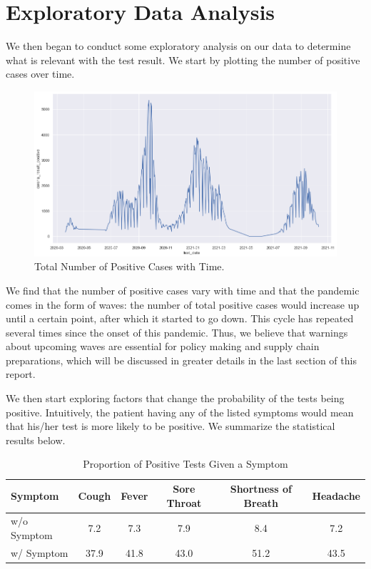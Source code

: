 \documentclass[a4paper]{article}
\begin{document}
\section*{Exploratory Data Analysis}
We then began to conduct some exploratory analysis on our data to determine what is relevant with the test result.
We start by plotting the number of positive cases over time. \par
\begin{figure}[H]
\centering
\includegraphics[scale=0.265]{total.png}
\caption{Total Number of Positive Cases with Time.}
\label{Confirmed Cases}
\end{figure}
We find that the number of positive cases vary with time and that the pandemic comes in the form of waves: the number of total positive cases would increase up until a certain point, after which it started to go down. This cycle has repeated several times since the onset of this pandemic. Thus, we believe that warnings about upcoming waves are essential for policy making and supply chain preparations, which will be discussed in greater details in the last section of this report. \par
We then start exploring factors that change the probability of the tests being positive. Intuitively, the patient having any of the listed symptoms would mean that his/her test is more likely to be positive. We summarize the statistical results below.\par
\begin{table}[H]
\centering
\caption{Proportion of Positive Tests Given a Symptom}
\begin{tabular}{| l | c | c | c | c | c |}
\hline
Symptom & Cough & Fever & Sore Throat & Shortness of Breath & Headache  \\ \hline
w/o Symptom & 7.2 & 7.3 & 7.9 & 8.4 & 7.2 \\ \hline
w/ Symptom & 37.9 & 41.8 & 43.0 & 51.2 & 43.5 \\
\hline
\end{tabular}
\label{Table}
\end{table}
\end{document}

